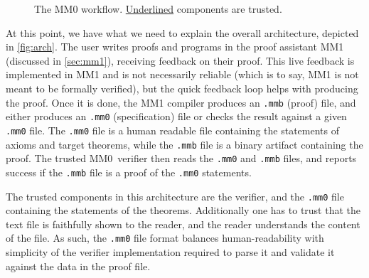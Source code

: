 \documentclass[runningheads]{llncs}
\newcommand{\mmO}{\textsf{MM0}}
\begin{document}
\begin{figure}
\begin{center}
\end{center}
\caption{The MM0 workflow. \uline{Underlined} components are trusted.}
\label{fig:arch}
\end{figure}
At this point, we have what we need to explain the overall architecture, depicted in \autoref{fig:arch}. The user writes proofs and programs in the proof assistant \textsf{MM1} (discussed in \autoref{sec:mm1}), receiving feedback on their proof. This live feedback is implemented in \textsf{MM1} and is not necessarily reliable (which is to say, \textsf{MM1} is not meant to be formally verified), but the quick feedback loop helps with producing the proof. Once it is done, the \textsf{MM1} compiler produces an \texttt{.mmb} (proof) file, and either produces an \texttt{.mm0} (specification) file or checks the result against a given \texttt{.mm0} file. The \texttt{.mm0} file is a human readable file containing the statements of axioms and target theorems, while the \texttt{.mmb} file is a binary artifact containing the proof. The trusted \mmO\ verifier then reads the \texttt{.mm0} and \texttt{.mmb} files, and reports success if the \texttt{.mmb} file is a proof of the \texttt{.mm0} statements.

The trusted components in this architecture are the verifier, and the \texttt{.mm0} file containing the statements of the theorems. Additionally one has to trust that the text file is faithfully shown to the reader, and the reader understands the content of the file. As such, the \texttt{.mm0} file format balances human-readability with simplicity of the verifier implementation required to parse it and validate it against the data in the proof file.
\end{document}

